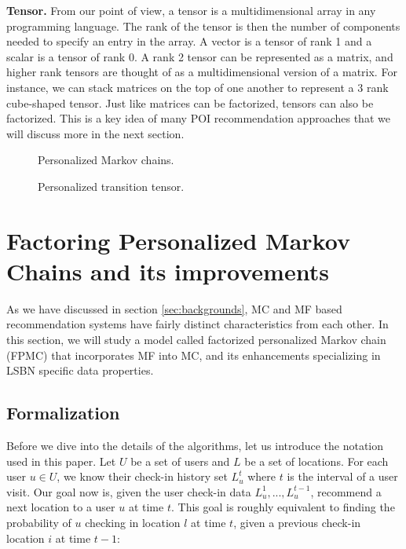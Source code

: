 \documentclass{sig-alternate}
\begin{document}
\textbf{Tensor.} From our point of view, a tensor is a multidimensional array in any programming language.
The rank of the tensor is then the number of components needed to specify an entry in the array. 
A vector is a tensor of rank 1 and a scalar is a tensor 
of rank 0. A rank 2 tensor can be represented as a matrix, and higher rank tensors 
are thought of as a multidimensional version of a matrix. For instance, we can stack matrices on 
the top of one another to represent a 3 rank cube-shaped tensor.
Just like matrices can be factorized, tensors can also be factorized. 
This is a key idea of many POI recommendation approaches 
that we will discuss more in the next section.

\begin{figure}
\centering
{}
\caption{Personalized Markov chains. \cite{Rendle:2010:FPM}}
\label{fig:FPMC_naive}
\end{figure}

\begin{figure}
\centering
{}
\caption{Personalized transition tensor. \cite{Rendle:2010:FPM}}
\label{fig:FPMC}
\end{figure}

\section{Factoring Personalized Markov Chains and its improvements}
\label{sec:fpmc}

As we have discussed in section \ref{sec:backgrounds}, MC and MF based recommendation systems
have fairly distinct characteristics from each other. In this section, we will study a model called 
factorized personalized Markov chain (FPMC) that incorporates MF into MC, and its 
enhancements specializing in LSBN specific data properties.

\subsection{Formalization}
\label{sec:typeChangesSpecialChars}

Before we dive into the details of the algorithms, let us introduce the notation used in this paper. 
Let $U$ be a set of users and $L$ be a set of locations. For each user $u \in U$, 
we know their check-in history set \begin{math}L^t_u\end{math} where $t$ is the interval 
of a user visit. Our goal now is, given the user check-in data 
\begin{math}L^1_u,...,L^{t-1}_u\end{math}, recommend a next location to 
a user $u$ at time $t$. This goal is roughly equivalent to finding the probability of $u$ 
checking in location $l$ at time $t$, given a previous check-in location $i$ at time $t-1$:
\end{document}
